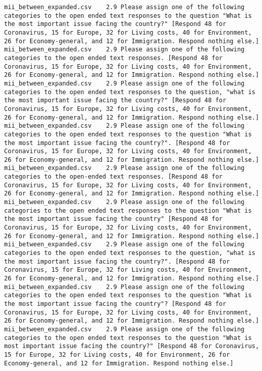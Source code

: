 \begin{lstlisting}[label=lst:promptvariants]
mii_between_expanded.csv	2.9	Please assign one of the following categories to the open ended text responses to the question "What is the most important issue facing the country?" [Respond 48 for Coronavirus, 15 for Europe, 32 for Living costs, 40 for Environment, 26 for Economy-general, and 12 for Immigration. Respond nothing else.]
mii_between_expanded.csv	2.9	Please assign one of the following categories to the open ended text responses. [Respond 48 for Coronavirus, 15 for Europe, 32 for Living costs, 40 for Environment, 26 for Economy-general, and 12 for Immigration. Respond nothing else.]
mii_between_expanded.csv	2.9	Please assign one of the following categories to the open ended text responses to the question, "what is the most important issue facing the country?" [Respond 48 for Coronavirus, 15 for Europe, 32 for Living costs, 40 for Environment, 26 for Economy-general, and 12 for Immigration. Respond nothing else.]
mii_between_expanded.csv	2.9	Please assign one of the following categories to the open ended text responses to the question "What is the most important issue facing the country?". [Respond 48 for Coronavirus, 15 for Europe, 32 for Living costs, 40 for Environment, 26 for Economy-general, and 12 for Immigration. Respond nothing else.]
mii_between_expanded.csv	2.9	Please assign one of the following categories to the open-ended text responses. [Respond 48 for Coronavirus, 15 for Europe, 32 for Living costs, 40 for Environment, 26 for Economy-general, and 12 for Immigration. Respond nothing else.]
mii_between_expanded.csv	2.9	Please assign one of the following categories to the open ended text responses to the question "What is the most important issue facing the country" [Respond 48 for Coronavirus, 15 for Europe, 32 for Living costs, 40 for Environment, 26 for Economy-general, and 12 for Immigration. Respond nothing else.]
mii_between_expanded.csv	2.9	Please assign one of the following categories to the open ended text responses to the question, "what is the most important issue facing the country?". [Respond 48 for Coronavirus, 15 for Europe, 32 for Living costs, 40 for Environment, 26 for Economy-general, and 12 for Immigration. Respond nothing else.]
mii_between_expanded.csv	2.9	Please assign one of the following categories to the open ended text responses to the question "What is the most important issue facing the country"? [Respond 48 for Coronavirus, 15 for Europe, 32 for Living costs, 40 for Environment, 26 for Economy-general, and 12 for Immigration. Respond nothing else.]
mii_between_expanded.csv	2.9	Please assign one of the following categories to the open ended text responses to the question "What is most important issue facing the country?" [Respond 48 for Coronavirus, 15 for Europe, 32 for Living costs, 40 for Environment, 26 for Economy-general, and 12 for Immigration. Respond nothing else.]

\end{lstlisting}
